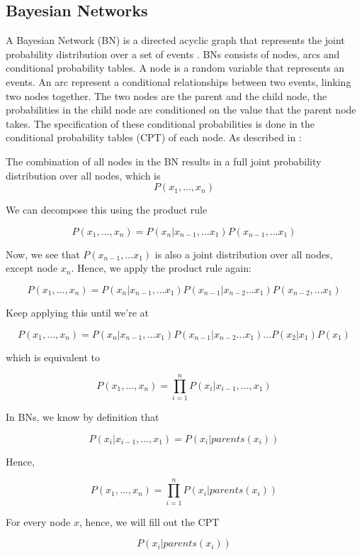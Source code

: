 \documentclass[12pt]{article}
\begin{document}
\subsection{Bayesian Networks}

A Bayesian Network (BN) is a directed acyclic graph that represents the joint probability distribution over a set of events \citep{pearl1988b}. BNs consists of nodes, arcs and conditional probability tables. A node is a random variable that represents an events. An arc represent a conditional relationships between two events, linking two nodes together. The two nodes are the parent and the child node, the probabilities in the child node are conditioned on the value that the parent node takes. The specification of these conditional probabilities is done in the conditional probability tables (CPT) of each node. As described in \citep{russellNorvig2010}:



The combination of all nodes in the BN results in a full joint probability distribution over all nodes, which is 
\[P(x_1, ..., x_n)\]

We can decompose this using the product rule

\[P(x_1, ..., x_n) =  P(x_n|x_{n-1},... x_1) P(x_{n-1},...x_1)\]

Now, we see that $P(x_{n-1},...x_1)$ is also a joint distribution over all nodes, except node $x_n$. Hence, we apply the product rule again:

\[P(x_1, ..., x_n) =  P(x_n|x_{n-1},... x_1) P(x_{n-1}| x_{n-2}...x_1) P(x_{n-2},...x_1)\]

Keep applying this until we're at

\[P(x_1, ..., x_n) =  P(x_n|x_{n-1},... x_1) P(x_{n-1}| x_{n-2}...x_1) ... P(x_2 | x_1)P(x_1)\]

which is equivalent to 

\[P(x_1, ..., x_n) =  \prod_{i=1}^n P(x_i | x_{i-1},..., x_1)\]

In BNs, we know by definition that  

\[ P(x_i | x_{i-1},..., x_1) = P(x_i | parents(x_i))\]

Hence,

\[P(x_1, ..., x_n) =  \prod_{i=1}^n P(x_i | parents(x_i))\]

For every node $x$, hence, we will fill out the CPT

\[P(x_i | parents(x_i))\]
\end{document}
